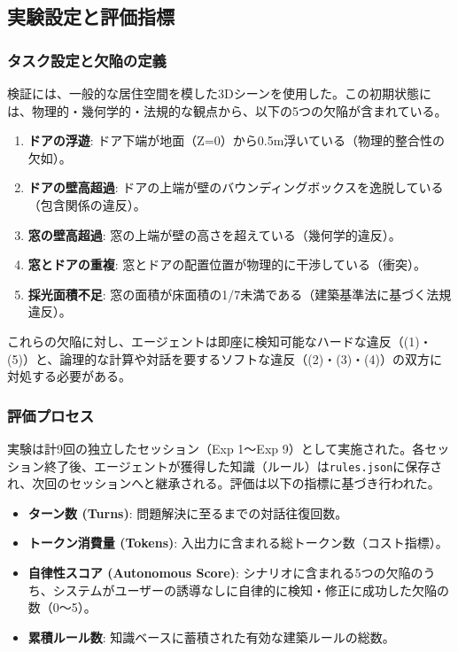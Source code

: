 \documentclass{deimj}
\begin{document}
\subsection{実験設定と評価指標}

\subsubsection{タスク設定と欠陥の定義}

検証には、一般的な居住空間を模した3Dシーンを使用した。この初期状態には、物理的・幾何学的・法規的な観点から、以下の5つの欠陥が含まれている。

\begin{enumerate}
  \item \textbf{ドアの浮遊}: ドア下端が地面（Z=0）から0.5m浮いている（物理的整合性の欠如）。
  \item \textbf{ドアの壁高超過}: ドアの上端が壁のバウンディングボックスを逸脱している（包含関係の違反）。
  \item \textbf{窓の壁高超過}: 窓の上端が壁の高さを超えている（幾何学的違反）。
  \item \textbf{窓とドアの重複}: 窓とドアの配置位置が物理的に干渉している（衝突）。
  \item \textbf{採光面積不足}: 窓の面積が床面積の1/7未満である（建築基準法に基づく法規違反）。
\end{enumerate}

これらの欠陥に対し、エージェントは即座に検知可能なハードな違反（(1)・(5)）と、論理的な計算や対話を要するソフトな違反（(2)・(3)・(4)）の双方に対処する必要がある。

\subsubsection{評価プロセス}

実験は計9回の独立したセッション（Exp 1〜Exp 9）として実施された。各セッション終了後、エージェントが獲得した知識（ルール）は\texttt{rules.json}に保存され、次回のセッションへと継承される。評価は以下の指標に基づき行われた。

\begin{itemize}
  \item \textbf{ターン数 (Turns)}: 問題解決に至るまでの対話往復回数。
  \item \textbf{トークン消費量 (Tokens)}: 入出力に含まれる総トークン数（コスト指標）。
  \item \textbf{自律性スコア (Autonomous Score)}: シナリオに含まれる5つの欠陥のうち、システムがユーザーの誘導なしに自律的に検知・修正に成功した欠陥の数（0〜5）。
  \item \textbf{累積ルール数}: 知識ベースに蓄積された有効な建築ルールの総数。
\end{itemize}
\end{document}
